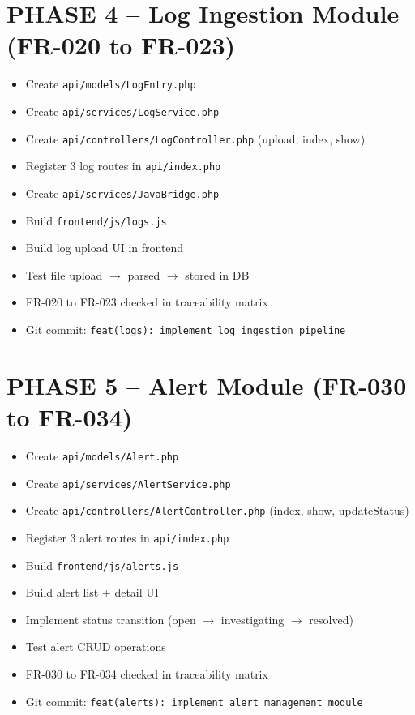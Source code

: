 \documentclass[11pt,a4paper]{article}
\newcommand{\undone}{\textcolor{helixgray}{\texttt{[ ] }}}
\newcommand{\filepath}[1]{\texttt{\small#1}}
\newcommand{\task}[2]{\item[#1] #2}
\begin{document}
\section{PHASE 4 -- Log Ingestion Module (FR-020 to FR-023)}

\begin{itemize}
    \task{\undone}{Create \filepath{api/models/LogEntry.php}}
    \task{\undone}{Create \filepath{api/services/LogService.php}}
    \task{\undone}{Create \filepath{api/controllers/LogController.php} (upload, index, show)}
    \task{\undone}{Register 3 log routes in \filepath{api/index.php}}
    \task{\undone}{Create \filepath{api/services/JavaBridge.php}}
    \task{\undone}{Build \filepath{frontend/js/logs.js}}
    \task{\undone}{Build log upload UI in frontend}
    \task{\undone}{Test file upload $\rightarrow$ parsed $\rightarrow$ stored in DB}
    \task{\undone}{FR-020 to FR-023 checked in traceability matrix}
    \task{\undone}{Git commit: \texttt{feat(logs): implement log ingestion pipeline}}
\end{itemize}

\section{PHASE 5 -- Alert Module (FR-030 to FR-034)}

\begin{itemize}
    \task{\undone}{Create \filepath{api/models/Alert.php}}
    \task{\undone}{Create \filepath{api/services/AlertService.php}}
    \task{\undone}{Create \filepath{api/controllers/AlertController.php} (index, show, updateStatus)}
    \task{\undone}{Register 3 alert routes in \filepath{api/index.php}}
    \task{\undone}{Build \filepath{frontend/js/alerts.js}}
    \task{\undone}{Build alert list + detail UI}
    \task{\undone}{Implement status transition (open $\rightarrow$ investigating $\rightarrow$ resolved)}
    \task{\undone}{Test alert CRUD operations}
    \task{\undone}{FR-030 to FR-034 checked in traceability matrix}
    \task{\undone}{Git commit: \texttt{feat(alerts): implement alert management module}}
\end{itemize}

\end{document}
